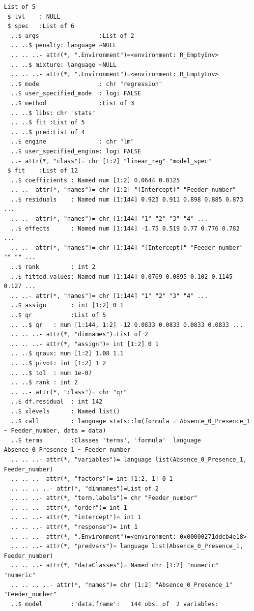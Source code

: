 \documentclass[
  letterpaper,
  DIV=11,
  numbers=noendperiod]{scrartcl}
\begin{document}
\begin{verbatim}
List of 5
 $ lvl    : NULL
 $ spec   :List of 6
  ..$ args                 :List of 2
  .. ..$ penalty: language ~NULL
  .. .. ..- attr(*, ".Environment")=<environment: R_EmptyEnv> 
  .. ..$ mixture: language ~NULL
  .. .. ..- attr(*, ".Environment")=<environment: R_EmptyEnv> 
  ..$ mode                 : chr "regression"
  ..$ user_specified_mode  : logi FALSE
  ..$ method               :List of 3
  .. ..$ libs: chr "stats"
  .. ..$ fit :List of 5
  .. ..$ pred:List of 4
  ..$ engine               : chr "lm"
  ..$ user_specified_engine: logi FALSE
  ..- attr(*, "class")= chr [1:2] "linear_reg" "model_spec"
 $ fit    :List of 12
  ..$ coefficients : Named num [1:2] 0.0644 0.0125
  .. ..- attr(*, "names")= chr [1:2] "(Intercept)" "Feeder_number"
  ..$ residuals    : Named num [1:144] 0.923 0.911 0.898 0.885 0.873 ...
  .. ..- attr(*, "names")= chr [1:144] "1" "2" "3" "4" ...
  ..$ effects      : Named num [1:144] -1.75 0.519 0.77 0.776 0.782 ...
  .. ..- attr(*, "names")= chr [1:144] "(Intercept)" "Feeder_number" "" "" ...
  ..$ rank         : int 2
  ..$ fitted.values: Named num [1:144] 0.0769 0.0895 0.102 0.1145 0.127 ...
  .. ..- attr(*, "names")= chr [1:144] "1" "2" "3" "4" ...
  ..$ assign       : int [1:2] 0 1
  ..$ qr           :List of 5
  .. ..$ qr   : num [1:144, 1:2] -12 0.0833 0.0833 0.0833 0.0833 ...
  .. .. ..- attr(*, "dimnames")=List of 2
  .. .. ..- attr(*, "assign")= int [1:2] 0 1
  .. ..$ qraux: num [1:2] 1.08 1.1
  .. ..$ pivot: int [1:2] 1 2
  .. ..$ tol  : num 1e-07
  .. ..$ rank : int 2
  .. ..- attr(*, "class")= chr "qr"
  ..$ df.residual  : int 142
  ..$ xlevels      : Named list()
  ..$ call         : language stats::lm(formula = Absence_0_Presence_1 ~ Feeder_number, data = data)
  ..$ terms        :Classes 'terms', 'formula'  language Absence_0_Presence_1 ~ Feeder_number
  .. .. ..- attr(*, "variables")= language list(Absence_0_Presence_1, Feeder_number)
  .. .. ..- attr(*, "factors")= int [1:2, 1] 0 1
  .. .. .. ..- attr(*, "dimnames")=List of 2
  .. .. ..- attr(*, "term.labels")= chr "Feeder_number"
  .. .. ..- attr(*, "order")= int 1
  .. .. ..- attr(*, "intercept")= int 1
  .. .. ..- attr(*, "response")= int 1
  .. .. ..- attr(*, ".Environment")=<environment: 0x00000271ddcb4e18> 
  .. .. ..- attr(*, "predvars")= language list(Absence_0_Presence_1, Feeder_number)
  .. .. ..- attr(*, "dataClasses")= Named chr [1:2] "numeric" "numeric"
  .. .. .. ..- attr(*, "names")= chr [1:2] "Absence_0_Presence_1" "Feeder_number"
  ..$ model        :'data.frame':   144 obs. of  2 variables:

\end{verbatim}
\end{document}
